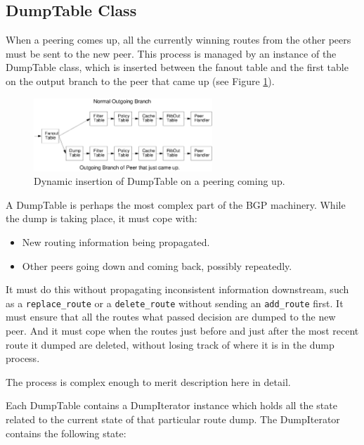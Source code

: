\documentclass[11pt]{article}
\begin{document}
\subsection{DumpTable Class}

When a peering comes up, all the currently winning routes from the
other peers must be sent to the new peer.  This process is managed by
an instance of the DumpTable class, which is inserted between the
fanout table and the first table on the output branch to the peer that
came up (see Figure \ref{dump_table}).

\begin{figure}[htb]
\centerline{\includegraphics[width=0.6\textwidth]{figs/dump_table}}
\vspace{.05in}
\caption{\label{dump_table}Dynamic insertion of DumpTable on
a peering coming up.}
\end{figure}

A DumpTable is perhaps the most complex part of the BGP machinery.
While the dump is taking place, it must cope with:

\begin{itemize}
  \item New routing information being propagated.
  \item Other peers going down and coming back, possibly repeatedly.
\end{itemize}

It must do this without propagating inconsistent information downstream,
such as a {\tt replace\_route} or a {\tt delete\_route} without
sending an {\tt add\_route} first.  It must ensure that all the routes
what passed decision are dumped to the new peer. And it must cope when
the routes just before and just after the most recent route it dumped
are deleted, without losing track of where it is in the dump process.

The process is complex enough to merit description here in detail.

Each DumpTable contains a DumpIterator instance which holds all the
state related to the current state of that particular route dump.  The
DumpIterator contains the following state:
\end{document}
